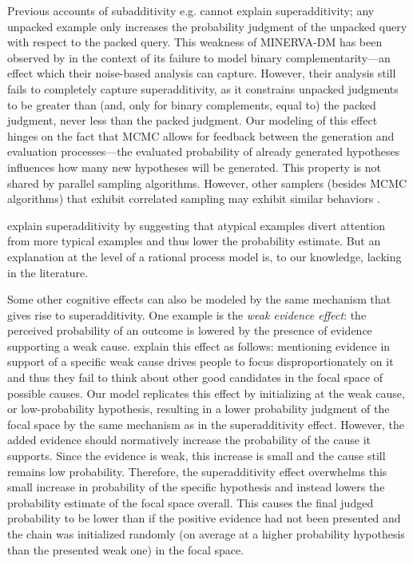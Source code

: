 Previous accounts of subadditivity e.g. \citet{Thomas2008, MINERVAsub} cannot explain superadditivity; any unpacked example only increases the probability judgment of the unpacked query with respect to the packed query. This weakness of MINERVA-DM has been observed by \cite{Costello2014} in the context of its failure to model binary complementarity---an effect which their noise-based analysis can capture. However, their analysis still fails to completely capture superadditivity, as it constrains unpacked judgments to be greater than (and, only for binary complements, equal to) the packed judgment, never less than the packed judgment. 
Our modeling of this effect hinges on the fact that MCMC allows for feedback between the generation and evaluation processes---the evaluated probability of already generated hypotheses influences how many new hypotheses will be generated. This property is not shared by  parallel sampling algorithms. However, other samplers (besides MCMC algorithms) that exhibit correlated sampling may exhibit similar behaviors \citep[see for example][]{Bonawitz2014}.

\cite{super} explain superadditivity by suggesting that atypical examples divert attention from more typical examples and thus lower the probability estimate. But an explanation at the level of a rational process model is, to our knowledge, lacking in the literature. 


Some other cognitive effects can also be modeled by the same mechanism that gives rise to superadditivity. One example is the \emph{weak evidence effect}: the perceived probability of an outcome is lowered by the presence of evidence supporting a weak cause. %
 \cite{weak} explain this effect as follows: mentioning evidence in support of a specific weak cause drives people to focus disproportionately on it and thus they fail to think about other good candidates in the focal space of possible causes. Our model replicates this effect by initializing at the weak cause, or low-probability hypothesis, resulting in a lower probability judgment of the focal space by the same mechanism as in the superadditivity effect. However, the added evidence should normatively increase the probability of the cause it supports. Since the evidence is weak, this increase is small and the cause still remains low probability. Therefore, the superadditivity effect overwhelms this small increase in probability of the specific hypothesis and instead lowers the probability estimate of the focal space overall. This causes the final judged probability to be lower than if the positive evidence had not been presented and the chain was initialized randomly (on average at a higher probability hypothesis than the presented weak one) in the focal space.

